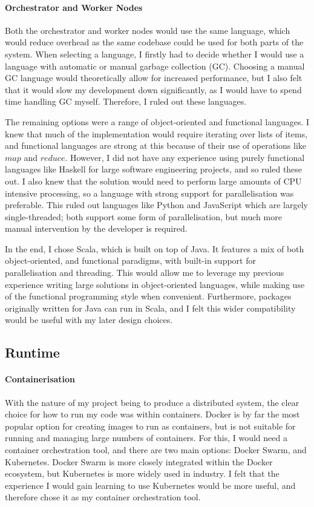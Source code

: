 \paragraph{Orchestrator and Worker Nodes}
Both the orchestrator and worker nodes would use the same language, which would reduce overhead as the same codebase could be used for both parts of the system. When selecting a language, I firstly had to decide whether I would use a language with automatic or manual garbage collection (GC). Choosing a manual GC language would theoretically allow for increased performance, but I also felt that it would slow my development down significantly, as I would have to spend time handling GC myself. Therefore, I ruled out these languages.

The remaining options were a range of object-oriented and functional languages. I knew that much of the implementation would require iterating over lists of items, and functional languages are strong at this because of their use of operations like $map$ and $reduce$. However, I did not have any experience using purely functional languages like Haskell for large software engineering projects, and so ruled these out. I also knew that the solution would need to perform large amounts of CPU intensive processing, so a language with strong support for parallelisation was preferable. This ruled out languages like Python and JavaScript which are largely single-threaded; both support some form of parallelisation, but much more manual intervention by the developer is required.

In the end, I chose Scala, which is built on top of Java. It features a mix of both object-oriented, and functional paradigms, with built-in support for parallelisation and threading. This would allow me to leverage my previous experience writing large solutions in object-oriented languages, while making use of the functional programming style when convenient. Furthermore, packages originally written for Java can run in Scala, and I felt this wider compatibility would be useful with my later design choices.
 
\subsection{Runtime}
\paragraph{Containerisation}
With the nature of my project being to produce a distributed system, the clear choice for how to run my code was within containers. Docker is by far the most popular option for creating images to run as containers, but is not suitable for running and managing large numbers of containers. For this, I would need a container orchestration tool, and there are two main options: Docker Swarm, and Kubernetes. Docker Swarm is more closely integrated within the Docker ecosystem, but Kubernetes is more widely used in industry. I felt that the experience I would gain learning to use Kubernetes would be more useful, and therefore chose it as my container orchestration tool.

